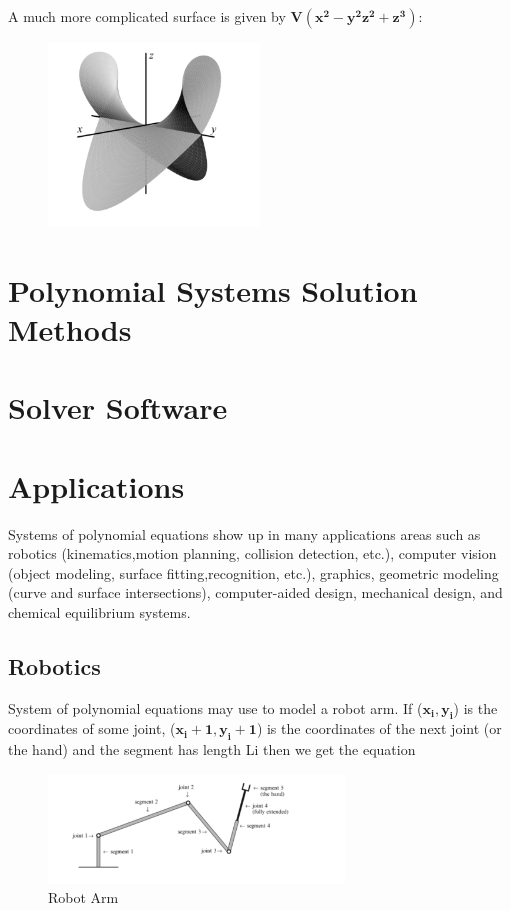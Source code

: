 \documentclass[11pt]{article}
\begin{document}
A much more complicated surface is given by $\mathbf{V(x^2 - y^2z^2 + z^3)}$:

\begin{figure}[H]
  \begin{center}
    \includegraphics[width=0.50\textwidth]{complicated.png}
    \caption{}
    \label{fig: }
  \end{center}
\end{figure}

\section{Polynomial Systems Solution Methods}


\section{Solver Software}

\section{Applications}
Systems of polynomial equations show up in many applications areas such as robotics (kinematics,motion planning, collision detection, etc.), computer vision (object modeling, surface fitting,recognition, etc.), graphics, geometric modeling (curve and surface intersections), computer-aided design, mechanical design, and chemical equilibrium systems. \cite{yanbinjiaArticle}
\subsection{Robotics}
System of polynomial equations may use to model a robot arm. If  ($\mathbf{x_i, y_i}$) is the coordinates of some joint,  ($\mathbf{x_i+1, y_i+1}$) is the coordinates of the next joint (or the hand) and the segment has length Li then we get the equation \cite{richterArticle}
\begin{figure}[H]
  \begin{center}
    \includegraphics[width=0.70\textwidth]{robotarm.png}
    \caption{Robot Arm}
    \label{fig: Robot Arm}
  \end{center}
\end{figure}
\end{document}
